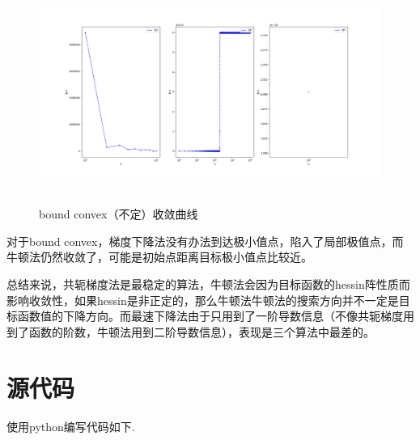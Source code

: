 \documentclass[UTF8]{ctexart}
\begin{document}
\begin{figure}[H]
  \centering
  \label{fig:Per6A}\includegraphics[width=1\textwidth]{UD.png}\
  \caption{bound convex（不定）收敛曲线}
  \label{fig:oscil}
\end{figure}

对于bound convex，梯度下降法没有办法到达极小值点，陷入了局部极值点，而牛顿法仍然收敛了，可能是初始点距离目标极小值点比较近。

总结来说，共轭梯度法是最稳定的算法，牛顿法会因为目标函数的hessin阵性质而影响收敛性，如果hessin是非正定的，那么牛顿法牛顿法的搜索方向并不一定是目标函数值的下降方向。而最速下降法由于只用到了一阶导数信息（不像共轭梯度用到了函数的阶数，牛顿法用到二阶导数信息），表现是三个算法中最差的。


\section{源代码}
使用python编写代码如下.  \vspace{5mm}
	
	\vspace{3mm}
\end{document}

